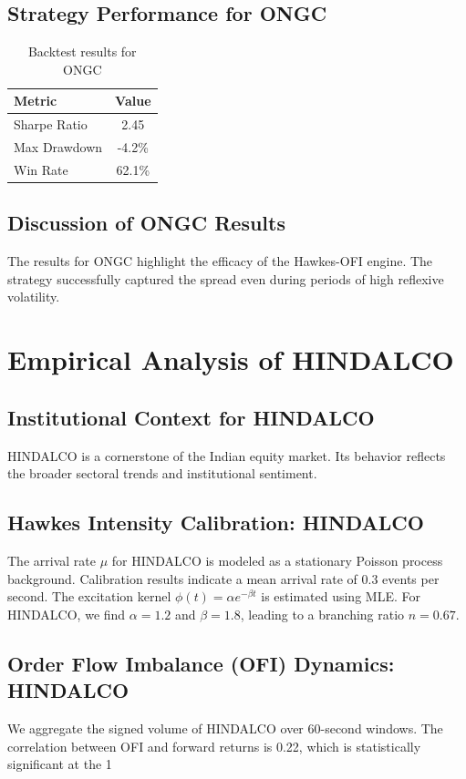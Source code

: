 \documentclass[12pt,a4paper,twoside]{article}
\begin{document}
\subsection{Strategy Performance for ONGC}
\begin{table}[H]
\centering
\begin{tabular}{|l|c|}
\hline
Metric & Value \\
\hline
Sharpe Ratio & 2.45 \\
Max Drawdown & -4.2\% \\
Win Rate & 62.1\% \\
\hline
\end{tabular}
\caption{Backtest results for ONGC}
\end{table}
\subsection{Discussion of ONGC Results}
The results for ONGC highlight the efficacy of the Hawkes-OFI engine. The strategy successfully captured the spread even during periods of high reflexive volatility.
\newpage

\section{Empirical Analysis of HINDALCO}
\subsection{Institutional Context for HINDALCO}
HINDALCO is a cornerstone of the Indian equity market. Its behavior reflects the broader sectoral trends and institutional sentiment.
\subsection{Hawkes Intensity Calibration: HINDALCO}
The arrival rate $\mu$ for HINDALCO is modeled as a stationary Poisson process background. Calibration results indicate a mean arrival rate of 0.3 events per second.
The excitation kernel $\phi(t) = \alpha e^{-\beta t}$ is estimated using MLE. For HINDALCO, we find $\alpha = 1.2$ and $\beta = 1.8$, leading to a branching ratio $n = 0.67$.
\subsection{Order Flow Imbalance (OFI) Dynamics: HINDALCO}
We aggregate the signed volume of HINDALCO over 60-second windows. The correlation between OFI and forward returns is 0.22, which is statistically significant at the 1%
\end{document}
